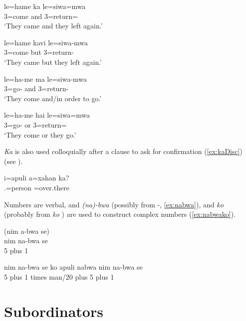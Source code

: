 \ea\label{ex:kaVC}
\gll le=hame ka le=siwa=mwa\\
 3=come and 3=return=\\
\glt `They came and they left again.'
\z


\ea\label{ex:kaviVC}
\gll le=hame kavi le=siwa-mwa\\
 3=come but 3=return-\\
\glt `They came but they left again.'
\z


\ea\label{ex:maVC}
\gll le=ha-me ma le=siwa-mwa\\
 3=go- and 3=return-\\
\glt `They come and/in order to go.'
\z


\ea\label{ex:haiVC}
\gll le=ha-me hai le=siwa=mwa\\
 3=go- or 3=return=\\
\glt `They come or they go.'
\z

\textit{Ka} is also used colloquially after a clause to ask for confirmation (\ref{ex:kaDisc}) (see ).

\ea \label{ex:kaDisc}
\gll i=apuli a=xahan ka?\\
 .=person =over.there \\
\glt {}
\z

Numbers are verbal, and \textit{(na)-bwa}  (possibly from -, \ref{ex:nabwa}), and \textit{ko}  (probably from \textit{ko} ) are used to construct complex numbers (\ref{ex:nabwako}). 


\ea\label{ex:nabwa}
(nim a-bwa se)\\
\gll nim na-bwa se\\
 5 plus 1\\
\glt {}
\z


\ea\label{ex:nabwako}
\gll nim na-bwa se ko apuli nabwa nim na-bwa se\\
  5 plus 1 times man/20 plus 5 plus 1\\
\glt {}
\z

\section{Subordinators}

